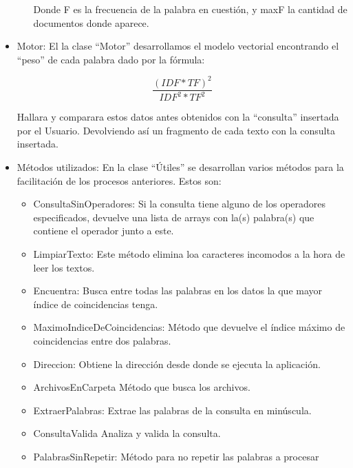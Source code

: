 \documentclass[a4paper, 12pt]{article}
\begin{document}
\begin{itemize}
\begin{itemize}
Donde F es la frecuencia de la palabra en cuestión, y maxF la cantidad de documentos 
donde aparece.
		\end{itemize}
\item Motor:
El la clase “Motor” desarrollamos el modelo vectorial encontrando el “peso” de cada
palabra dado por la fórmula:
	\begin{center}
		$$
			\frac{{(IDF*TF)}^2}{{IDF}^2*{TF}^2}
		$$
	\end{center}
 Hallara y comparara estos datos antes obtenidos con la “consulta” insertada por el 
 Usuario. Devolviendo así un fragmento de cada texto con la consulta insertada.
\item Métodos utilizados:
En la clase “Útiles” se desarrollan varios métodos para la facilitación de los procesos 
anteriores. Estos son:
		\begin{itemize}
\item ConsultaSinOperadores:
Si la consulta tiene alguno de los operadores especificados, devuelve una lista de arrays
con la(s) palabra(s) que contiene el operador junto a este.
\item LimpiarTexto:
Este método elimina loa caracteres incomodos a la hora de leer los textos.
\item Encuentra:
Busca entre todas las palabras en los datos la que mayor índice de coincidencias tenga.
\item MaximoIndiceDeCoincidencias:
Método que devuelve el índice máximo de coincidencias entre dos palabras.
\item Direccion:
Obtiene la dirección desde donde se ejecuta la aplicación.
\item ArchivosEnCarpeta
Método que busca los archivos.
\item ExtraerPalabras:
Extrae las palabras de la consulta en minúscula.
\item ConsultaValida
Analiza y valida la consulta.
\item PalabrasSinRepetir:
Método para no repetir las palabras a procesar
		\end{itemize}
\end{itemize}
\end{document}
